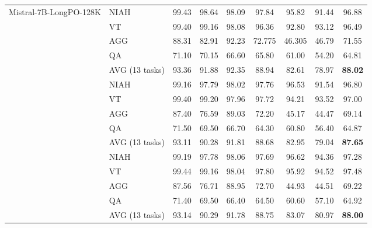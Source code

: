 \begin{table}[!t]
{\begin{tabular}{l l c c c c c c c}
\midrule
\multirow{5}{*}{Mistral-7B-LongPO-128K} 
& NIAH & 99.43 & 98.64 & 98.09 & 97.84 & 95.82 & 91.44 & 96.88 \\
& VT & 99.40 & 99.16 & 98.08 & 96.36 & 92.80 & 93.12 & 96.49 \\
& AGG & 88.31 & 82.91 & 92.23 & 72.775 & 46.305 & 46.79 & 71.55 \\
& QA & 71.10 & 70.15 & 66.60 & 65.80 & 61.00 & 54.20 & 64.81 \\
& AVG (13 tasks) & 93.36 & 91.88 & 92.35 & 88.94 & 82.61 & 78.97 & \textbf{88.02} \\
\addlinespace
\hdashline
\addlinespace
\multirow{5}{*}{Mistral-7B-LongPO-256K} 
& NIAH & 99.16 & 97.79 & 98.02 & 97.76 & 96.53 & 91.54 & 96.80 \\
& VT & 99.40 & 99.20 & 97.96 & 97.72 & 94.21 & 93.52 & 97.00 \\
& AGG & 87.40 & 76.59 & 89.03 & 72.20 & 45.17 & 44.47 & 69.14 \\
& QA & 71.50 & 69.50 & 66.70 & 64.30 & 60.80 & 56.40 & 64.87 \\
& AVG (13 tasks) & 93.11 & 90.28 & 91.81 & 88.68 & 82.95 & 79.04 & \textbf{87.65} \\
\addlinespace
\hdashline
\addlinespace
\multirow{5}{*}{Mistral-7B-LongPO-512K} 
& NIAH & 99.19 & 97.78 & 98.06 & 97.69 & 96.62 & 94.36 & 97.28 \\
& VT & 99.44 & 99.16 & 98.04 & 97.80 & 95.92 & 94.52 & 97.48 \\
& AGG & 87.56 & 76.71 & 88.95 & 72.70 & 44.93 & 44.51 & 69.22 \\
& QA & 71.40 & 69.50 & 66.40 & 64.50 & 60.60 & 57.10 & 64.92 \\
& AVG (13 tasks) & 93.14 & 90.29 & 91.78 & 88.75 & 83.07 & 80.97 & \textbf{88.00} \\
\bottomrule
\end{tabular}%
}
\end{table}




